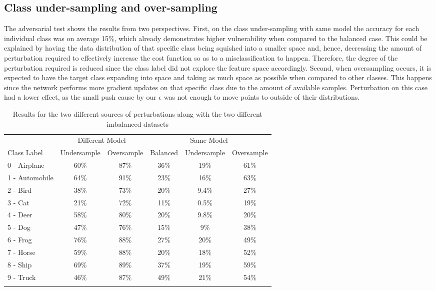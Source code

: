 \documentclass[runningheads,a4paper]{llncs}
\begin{document}
\subsection{Class under-sampling and over-sampling}
The adversarial test shows the results from two perspectives. First, on the class under-sampling with same model the accuracy for each individual class was on average 15\%, which already demonstrates higher vulnerability when compared to the balanced case. This could be explained by having the data distribution of that specific class being squished into a smaller space and, hence, decreasing the amount of perturbation required to effectively increase the cost function so as to a misclassification to happen. Therefore, the degree of the perturbation required is reduced since the class label did not explore the feature space accordingly. Second, when oversampling occurs, it is expected to have the target class expanding into space and taking as much space as possible when compared to other classes. This happens since the network performs more gradient updates on that specific class due to the amount of available samples. Perturbation on this case had a lower effect, as the small push cause by our $\epsilon$ was not enough to move points to outside of their distributions.



\begin{table}[H]
	\centering
	
	\begin{tabular}{lccccc}
		\toprule
		&\multicolumn{2}{c}{Different Model}
		&\multicolumn{3}{c}{Same Model}
		\\\cmidrule(r){2-3}\cmidrule(l){4-6}
		Class Label &Undersample &Oversample &Balanced &Undersample &Oversample \\
		\midrule
		0 - Airplane &60\%& 87\% &36\%& 19\%    & 61\% \\
		1 - Automobile &64\%& 91\% &23\%& 16\%    & 63\% \\
		2 - Bird &38\%& 73\% &20\%& 9.4\%    & 27\% \\
		3 - Cat &21\%& 72\% &11\%& 0.5\%    & 19\% \\
		4 - Deer &58\%& 80\% &20\%& 9.8\%    & 20\% \\
		5 - Dog &47\%& 76\% &15\%& 9\%    & 38\% \\
		6 - Frog &76\%& 88\% &27\%& 20\%    & 49\% \\
		7 - Horse &59\%& 88\% &20\%& 18\%    & 52\% \\
		8 - Ship &69\%& 89\% &37\%& 19\%    & 59\% \\
		9 - Truck &46\%& 87\% &49\%& 21\%    & 54\% \\
		\bottomrule	
		\hfill
	\end{tabular}
	\caption{Results for the two different sources of perturbations along with the two different imbalanced datasets}
	\label{tbl:results}
\end{table}
\end{document}
